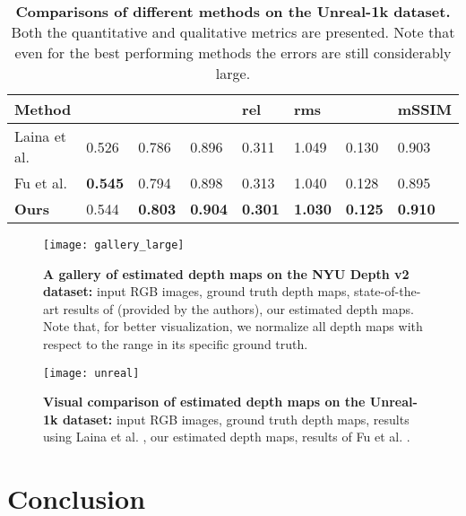 \documentclass[10pt,twocolumn,letterpaper]{article}
\begin{document}
\begin{table*}[t]
\centering
\begin{tabular}{l|lll|lll|l}
\toprule
Method         &  &  &  & rel   & rms   &  & mSSIM  \\ 
\midrule
Laina et al. \cite{Laina2016}    & 0.526   &  0.786  & 0.896  & 0.311  & 1.049  &  0.130 & 0.903 \\
Fu et al. \cite{Fu2018DeepOR}    & \textbf{0.545} &  0.794  & 0.898  & 0.313  & 1.040  & 0.128 & 0.895 \\
\textbf{Ours}                    & 0.544  &  \textbf{0.803}  &  \textbf{0.904} & \textbf{0.301}  &  \textbf{1.030}  & \textbf{0.125} & \textbf{0.910}  \\
\bottomrule
\end{tabular}
\bigskip
\caption{\textbf{Comparisons of different methods on the Unreal-1k dataset.} Both the quantitative and qualitative metrics are presented. Note that even for the best performing methods the errors are still considerably large.}
\label{tab:3}
\end{table*}


\begin{figure*}[t]
\begin{center}
\texttt{[image: gallery\_large]}
\end{center}
   \caption{\textbf{A gallery of estimated depth maps on the NYU Depth v2 dataset:} input RGB images, ground truth depth maps, state-of-the-art results of \cite{Fu2018DeepOR} (provided by the authors), our estimated depth maps. Note that, for better visualization, we normalize all depth maps with respect to the range in its specific ground truth. }
\label{fig:gallery}
\end{figure*}



\begin{figure*}[t]
\begin{center}
\texttt{[image: unreal]}
\end{center}
   \caption{\textbf{Visual comparison of estimated depth maps on the Unreal-1k dataset:} input RGB images, ground truth depth maps, results using Laina et al. \cite{Laina2016}, our estimated depth maps, results of Fu et al. \cite{Fu2018DeepOR}.}
\label{fig:unreal}
\end{figure*}


\section{Conclusion}
\end{document}
